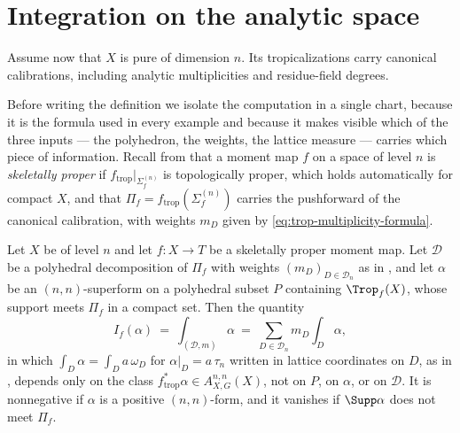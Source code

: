 \section{Integration on the analytic space}
\label{sec:ch13-integration}

Assume now that $X$ is pure of dimension $n$.  Its tropicalizations carry
canonical calibrations, including analytic multiplicities and residue-field
degrees.

Before writing the definition we isolate the computation in a single chart,
because it is the formula used in every example and because it makes visible
which of the three inputs --- the polyhedron, the weights, the lattice
measure --- carries which piece of information.  Recall from
 that a moment map $f$ on a space of level
$n$ is \emph{skeletally proper} if $f_{\mathrm{trop}}|_{\Sigma_f^{(n)}}$ is
topologically proper, which holds automatically for compact $X$, and that
$\Pi_f=f_{\mathrm{trop}}(\Sigma_f^{(n)})$ carries the pushforward of the
canonical calibration, with weights $m_D$ given by
\eqref{eq:trop-multiplicity-formula}.

\begin{proposition}
\label{prop:ch13-chart-integral}
Let $X$ be of level $n$ and let $f:X\to T$ be a skeletally proper moment map.
Let $\mathscr D$ be a polyhedral decomposition of $\Pi_f$ with weights
$(m_D)_{D\in\mathscr D_n}$ as in , and
let $\alpha$ be an $(n,n)$-superform on a polyhedral subset $P$ containing
$\Trop_f(X)$, whose support meets $\Pi_f$ in a compact set.  Then the
quantity
\begin{equation}
\label{eq:ch13-chart-integral}
 I_f(\alpha)
 \ =\ \int_{(\mathscr D,m)}\alpha
 \ =\ \sum_{D\in\mathscr D_n}m_D\int_D\alpha ,
\end{equation}
in which $\int_D\alpha=\int_Da\,\omega_D$ for $\alpha|_D=a\,\tau_n$ written
in lattice coordinates on $D$, as in ,
depends only on the class $f_{\mathrm{trop}}^*\alpha\in A^{n,n}_{X,G}(X)$,
not on $P$, on $\alpha$, or on $\mathscr D$.  It is nonnegative if $\alpha$
is a positive $(n,n)$-form, and it vanishes if $\Supp\alpha$ does not meet
$\Pi_f$.
\end{proposition}

